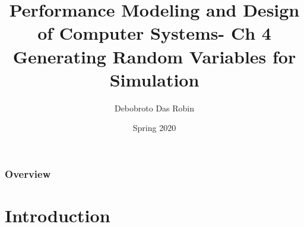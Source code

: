 \documentclass{beamer}
\title{Performance Modeling and
Design of Computer Systems- Ch 4 \\
Generating Random Variables
for Simulation
}
\author{Debobroto Das Robin} %
\institute{Kent State University}
\date{Spring 2020}
\begin{document}
\begin{frame}
        \titlepage
        \begin{center}
    \href{mailto:drobin@kent.edu}{}
        \end{center}
\end{frame}

\begin{frame}
\frametitle{Overview} %
\tableofcontents %
\end{frame}



\section{Introduction}
\end{document}
